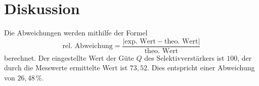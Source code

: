 %

\section{Diskussion}
\label{sec:Diskussion}
Die Abweichungen werden mithilfe der Formel
\begin{equation*}
    \text{rel. Abweichung} = \frac{|\text{exp. Wert} - \text{theo. Wert}|}{\text{theo. Wert}}
  \end{equation*}
berechnet. Der eingestellte Wert der Güte $Q$ des Selektivverstärkers ist $100$, der durch die Messwerte ermittelte Wert ist $73,52$. Dies entspricht einer Abweichung
von $26,48 \,\%$.
